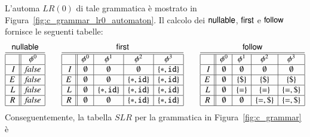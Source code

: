 %
L'automa $\mathit{LR}(0)$ di tale
grammatica \`e mostrato in Figura~\ref{fig:c_grammar_lr0_automaton}.
Il calcolo dei $\mathsf{nullable}$, $\mathsf{first}$ e $\mathsf{follow}$ fornisce le seguenti tabelle:
%
\[
  \begin{array}{|r||c|}
    \multicolumn{2}{c}{\nullable}\\\hline\hline
    & \phi^0 \\\hline
    I & \mathit{false} \\\hline
    E & \mathit{false} \\\hline
    L & \mathit{false} \\\hline
    R & \mathit{false} \\\hline
  \end{array}\qquad
  \begin{array}{|r||c|c|c|c|}
    \multicolumn{5}{c}{\first}\\\hline\hline
    & \phi^0 & \phi^1 & \phi^2 & \phi^3\\\hline
    I & \emptyset & \emptyset & \emptyset & \{\mathtt{*},\mathtt{id}\} \\\hline
    E & \emptyset & \emptyset & \{\mathtt{*},\mathtt{id}\} &
      \{\mathtt{*},\mathtt{id}\} \\\hline
    L & \emptyset & \{\mathtt{*},\mathtt{id}\} & \{\mathtt{*},\mathtt{id}\}
      & \{\mathtt{*},\mathtt{id}\}\\\hline
    R & \emptyset & \emptyset & \{\mathtt{*},\mathtt{id}\} &
      \{\mathtt{*},\mathtt{id}\}\\\hline
  \end{array}\qquad
  \begin{array}{|r||c|c|c|c|}
    \multicolumn{5}{c}{\follow}\\\hline\hline
    & \phi^0 & \phi^1 & \phi^2 & \phi^3 \\\hline
    I & \emptyset & \emptyset & \emptyset & \emptyset\\\hline
    E & \emptyset & \{\mathtt{\$}\} & \{\mathtt{\$}\} & \{\mathtt{\$}\}\\\hline
    L & \emptyset & \{\mathtt{=}\} & \{\mathtt{=}\} & \{\mathtt{=},\mathtt{\$}\}\\\hline
    R & \emptyset & \emptyset & \{\mathtt{=},\mathtt{\$}\} & \{\mathtt{=},\mathtt{\$}\}\\\hline
  \end{array}
\]
%
Conseguentemente, la tabella $\mathit{SLR}$ per la grammatica in
Figura~\ref{fig:c_grammar} \`e
